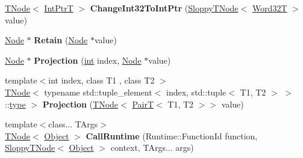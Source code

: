 \begin{DoxyCompactItemize}
\item 
\mbox{\label{classv8_1_1internal_1_1compiler_1_1CodeAssembler_abf5e278bc28e82930afee0d270c63c9a}} 
\mbox{\hyperlink{classv8_1_1internal_1_1compiler_1_1TNode}{T\+Node}}$<$ \mbox{\hyperlink{structv8_1_1internal_1_1IntPtrT}{Int\+PtrT}} $>$ {\bfseries Change\+Int32\+To\+Int\+Ptr} (\mbox{\hyperlink{classv8_1_1internal_1_1compiler_1_1SloppyTNode}{Sloppy\+T\+Node}}$<$ \mbox{\hyperlink{structv8_1_1internal_1_1Word32T}{Word32T}} $>$ value)
\item 
\mbox{\label{classv8_1_1internal_1_1compiler_1_1CodeAssembler_aed6a3eb8f038ee753cb9d109f769768a}} 
\mbox{\hyperlink{classv8_1_1internal_1_1compiler_1_1Node}{Node}} $\ast$ {\bfseries Retain} (\mbox{\hyperlink{classv8_1_1internal_1_1compiler_1_1Node}{Node}} $\ast$value)
\item 
\mbox{\label{classv8_1_1internal_1_1compiler_1_1CodeAssembler_ad0c681ec2f62d86a05ded7d7e5a488af}} 
\mbox{\hyperlink{classv8_1_1internal_1_1compiler_1_1Node}{Node}} $\ast$ {\bfseries Projection} (\mbox{\hyperlink{classint}{int}} index, \mbox{\hyperlink{classv8_1_1internal_1_1compiler_1_1Node}{Node}} $\ast$value)
\item 
\mbox{\label{classv8_1_1internal_1_1compiler_1_1CodeAssembler_a61f9e5cf83020f9c02e4b282847656b0}} 
{\footnotesize template$<$int index, class T1 , class T2 $>$ }\\\mbox{\hyperlink{classv8_1_1internal_1_1compiler_1_1TNode}{T\+Node}}$<$ typename std\+::tuple\+\_\+element$<$ index, std\+::tuple$<$ T1, T2 $>$ $>$\+::\mbox{\hyperlink{classstd_1_1conditional_1_1type}{type}} $>$ {\bfseries Projection} (\mbox{\hyperlink{classv8_1_1internal_1_1compiler_1_1TNode}{T\+Node}}$<$ \mbox{\hyperlink{structv8_1_1internal_1_1PairT}{PairT}}$<$ T1, T2 $>$$>$ value)
\item 
\mbox{\label{classv8_1_1internal_1_1compiler_1_1CodeAssembler_aad16703cab47aaaa722398c590494988}} 
{\footnotesize template$<$class... T\+Args$>$ }\\\mbox{\hyperlink{classv8_1_1internal_1_1compiler_1_1TNode}{T\+Node}}$<$ \mbox{\hyperlink{classv8_1_1internal_1_1Object}{Object}} $>$ {\bfseries Call\+Runtime} (Runtime\+::\+Function\+Id function, \mbox{\hyperlink{classv8_1_1internal_1_1compiler_1_1SloppyTNode}{Sloppy\+T\+Node}}$<$ \mbox{\hyperlink{classv8_1_1internal_1_1Object}{Object}} $>$ context, T\+Args... args)
$$
\end{DoxyCompactItemize}
